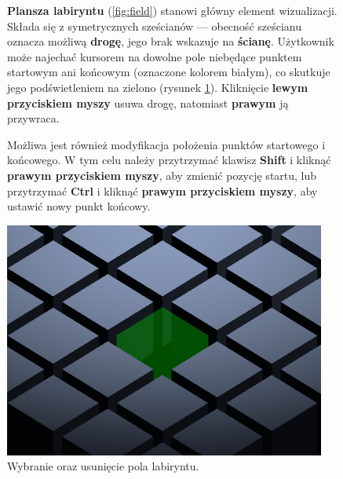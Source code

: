 \documentclass[../doc.tex]{subfiles}
\begin{document}
    \begin{figure}[H]
        \centering
        \begin{minipage}[c]{0.6\textwidth}
            \textbf{Plansza labiryntu} (\cref{fig:field}) stanowi główny element wizualizacji. Składa się z symetrycznych sześcianów — obecność sześcianu oznacza możliwą \textbf{drogę}, jego brak wskazuje na \textbf{ścianę}. Użytkownik może najechać kursorem na dowolne pole niebędące punktem startowym ani końcowym (oznaczone kolorem białym), co skutkuje jego podświetleniem na zielono (rysunek \ref{fig:cursor}). Kliknięcie \textbf{lewym przyciskiem myszy} usuwa drogę, natomiast \textbf{prawym} ją przywraca.

            Możliwa jest również modyfikacja położenia punktów startowego i końcowego. W tym celu należy przytrzymać klawisz \textbf{Shift} i kliknąć \textbf{prawym przyciskiem myszy}, aby zmienić pozycję startu, lub przytrzymać \textbf{Ctrl} i kliknąć \textbf{prawym przyciskiem myszy}, aby ustawić nowy punkt końcowy.

        \end{minipage}
        \hfill
        \begin{minipage}[c]{0.35\textwidth}
            \centering
            \includegraphics[width=\linewidth]{figures/cursor.png}
            \caption{\centering Wybranie oraz usunięcie pola labiryntu.}
            \label{fig:cursor}
        \end{minipage}
    \end{figure}

    \vspace{-9pt}
\end{document}

